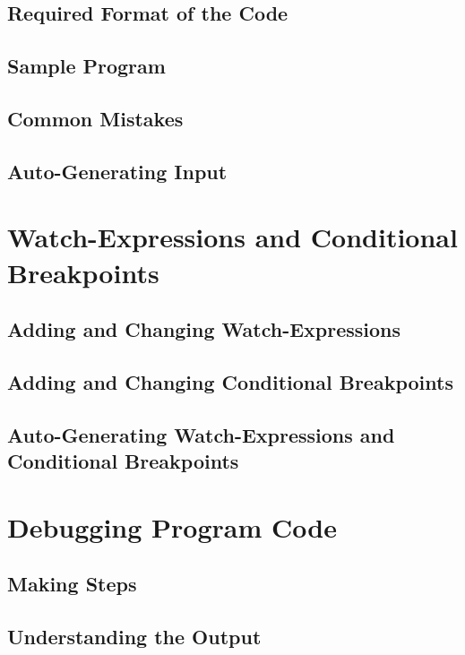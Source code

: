\documentclass[parskip=full]{memoir}
\begin{document}
\section{Required Format of the Code}
\section{Sample Program}
\section{Common Mistakes}
\section{Auto-Generating Input}

\chapter{Watch-Expressions and Conditional Breakpoints} %
\section{Adding and Changing Watch-Expressions}
\section{Adding and Changing Conditional Breakpoints}
\section{Auto-Generating Watch-Expressions and Conditional Breakpoints}

\chapter{Debugging Program Code} %
\section{Making Steps}
\section{Understanding the Output}
\end{document}
